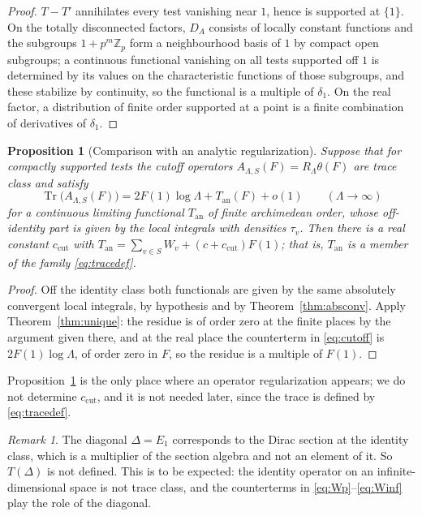 \documentclass[11pt]{amsart}
\newtheorem{proposition}[theorem]{Proposition}
\theoremstyle{definition}
\theoremstyle{remark}
\newtheorem{remark}[theorem]{Remark}
\newcommand{\Z}{\mathbb Z}
\newcommand{\Tr}{\operatorname{Tr}}
\newcommand{\DA}{D_A}
\begin{document}
\begin{proof}
$T-T'$ annihilates every test vanishing near $1$, hence is supported at
$\{1\}$.  On the totally disconnected factors, $\DA$ consists of locally
constant functions and the subgroups $1+p^{m}\Z_p$ form a neighbourhood basis
of $1$ by compact open subgroups; a continuous functional vanishing on all
tests supported off $1$ is determined by its values on the characteristic
functions of those subgroups, and these stabilize by continuity, so the
functional is a multiple of $\delta_1$.  On the real factor, a distribution of
finite order supported at a point is a finite combination of derivatives of
$\delta_1$.
\end{proof}

\begin{proposition}[Comparison with an analytic
regularization]\label{prop:comparison}
Suppose that for compactly supported tests the cutoff operators
$A_{\Lambda,S}(F)=R_{\Lambda}\theta(F)$ are trace class and satisfy
\begin{equation}\label{eq:cutoff}
\Tr\bigl(A_{\Lambda,S}(F)\bigr)=2F(1)\log\Lambda+T_{\mathrm{an}}(F)+o(1)
\qquad(\Lambda\to\infty)
\end{equation}
for a continuous limiting functional $T_{\mathrm{an}}$ of finite archimedean
order, whose off-identity part is given by the local integrals with densities
$\tau_v$.  Then there is a real constant $c_{\mathrm{cut}}$ with
$T_{\mathrm{an}}=\sum_{v\in S}W_v+(c+c_{\mathrm{cut}})F(1)$; that is,
$T_{\mathrm{an}}$ is a member of the family \eqref{eq:tracedef}.
\end{proposition}

\begin{proof}
Off the identity class both functionals are given by the same absolutely
convergent local integrals, by hypothesis and by
Theorem~\ref{thm:absconv}.  Apply Theorem~\ref{thm:unique}: the residue is of
order zero at the finite places by the argument given there, and at the real
place the counterterm in \eqref{eq:cutoff} is $2F(1)\log\Lambda$, of order zero
in $F$, so the residue is a multiple of $F(1)$.
\end{proof}

Proposition~\ref{prop:comparison} is the only place where an operator
regularization appears; we do not determine $c_{\mathrm{cut}}$, and it is not
needed later, since the trace is defined by \eqref{eq:tracedef}.

\begin{remark}\label{rem:diagonal}
The diagonal $\Delta=E_1$ corresponds to the Dirac section at the identity
class, which is a multiplier of the section algebra and not an element of it.
So $T(\Delta)$ is not defined.  This is to be expected: the identity operator
on an infinite-dimensional space is not trace class, and the counterterms in
\eqref{eq:Wp}--\eqref{eq:Winf} play the role of the diagonal.
\end{remark}
\end{document}
